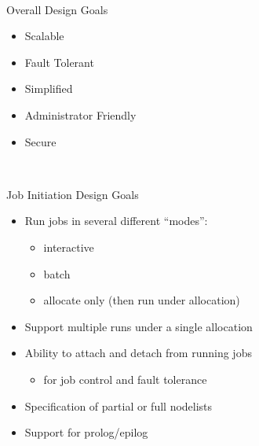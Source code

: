\documentclass[article,letter,landscape]{seminar}
\begin{document}


\begin{slide}
  \mbox{}\\
  \begin{center}
  Overall Design Goals\\
  \begin{itemize}
     \item Scalable
     \item Fault Tolerant
     \item Simplified
     \item Administrator Friendly
     \item Secure
  \end{itemize}
  \end{center}
\end{slide}

\begin{slide}
  \mbox{}\\
  \begin{center}
  Job Initiation Design Goals\\
  \begin{itemize}
    \item Run jobs in several different ``modes'':
    \begin{itemize}
      \item interactive
      \item batch
      \item allocate only (then run under allocation)
    \end{itemize}
    \item Support multiple runs under a single allocation
    \item Ability to attach and detach from running jobs
    \begin{itemize}
      \item for job control and fault tolerance
    \end{itemize}
    \item Specification of partial or full nodelists
    \item Support for prolog/epilog
  \end{itemize}
  \end{center}
\end{slide}
\end{document}
